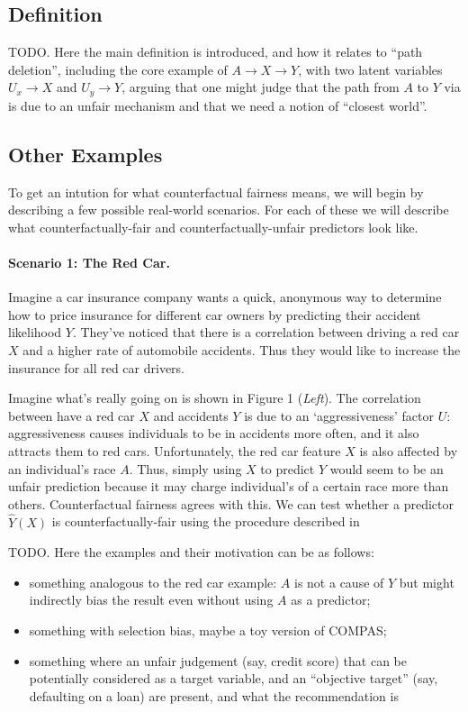 \subsection{Definition}

TODO. Here the main definition is introduced, and how it relates to ``path deletion'',
including the core example of $A \rightarrow X \rightarrow Y$, with two latent
variables $U_x \rightarrow X$ and $U_y \rightarrow Y$, arguing that one might judge
that the path from $A$ to $Y$ via is due to an unfair mechanism and that we need a
notion of ``closest world''.

\subsection{Other Examples}
To get an intution for what counterfactual fairness means, we will begin by describing a few possible real-world scenarios. For each of these we will describe what counterfactually-fair and counterfactually-unfair predictors look like.

\paragraph{Scenario 1: The Red Car.}
Imagine a car insurance company wants a quick, anonymous way to determine how to price insurance for different car owners by predicting their accident likelihood $Y$. They've noticed that there is a correlation between driving a red car $X$ and a higher rate of automobile accidents. Thus they would like to increase the insurance for all red car drivers. 

Imagine what's really going on is shown in Figure 1 (\emph{Left}). The correlation between have a red car $X$ and accidents $Y$ is due to an `aggressiveness' factor $U$: aggressiveness causes individuals to be in accidents more often, and it also attracts them to red cars. Unfortunately, the red car feature $X$ is also affected by an individual's race $A$. Thus, simply using $X$ to predict $Y$ would seem to be an unfair prediction because it may charge individual's of a certain race more than others. Counterfactual fairness agrees with this. We can test whether a predictor $\hat{Y}(X)$ is counterfactually-fair using the procedure described in 



TODO. Here the examples and their motivation can be as follows:

\begin{itemize}
\item something analogous to the red car example: $A$ is not a cause of
  $Y$ but might indirectly bias the result even without using $A$ as a predictor;
\item something with selection bias, maybe a toy version of COMPAS;
\item something where an unfair judgement (say, credit score) that can be potentially
  considered as a target variable, and an
  ``objective target'' (say, defaulting on a loan) are present, and
  what the recommendation is
\end{itemize}